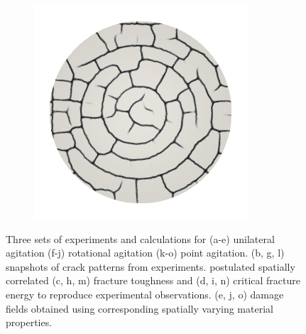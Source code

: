 \begin{figure}[htb!]
\begin{subfigure}{0.15\textwidth}
    \caption{}
  \end{subfigure}
  \begin{subfigure}{0.15\textwidth}
    \includegraphics[width=\textwidth]{Chapter4/figures/2D/d_ring.png}
    \caption{}
  \end{subfigure}
  \caption{Three sets of experiments and calculations for (a-e) unilateral agitation (f-j) rotational agitation (k-o) point agitation. (b, g, l) snapshots of crack patterns from experiments. postulated spatially correlated (c, h, m) fracture toughness and (d, i, n) critical fracture energy to reproduce experimental observations. (e, j, o) damage fields obtained using corresponding spatially varying material properties. }
  \label{fig: Chapter4/2D/japanese_experiments}
\end{figure}
